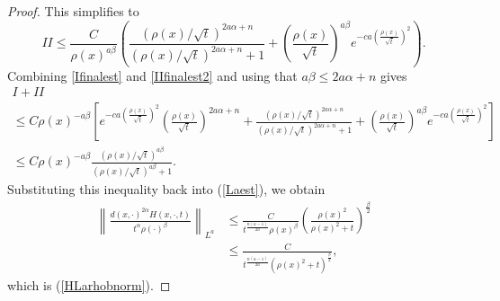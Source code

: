 \documentclass[10pt,a4paper]{amsart}
\begin{document}
\begin{proof}
    This simplifies to 
    \begin{equation} \label{IIfinalest2}
        II \le
        \frac C{\rho(x)^{a \beta} } \left( \frac{(\rho(x)/\sqrt t)^{2 a \alpha + n}}{(\rho(x)/\sqrt t)^{2 a \alpha+n} + 1}
        +  \left( \frac {\rho(x)} {\sqrt t}\right)^{a \beta}  e^{- c a \left(\frac{\rho(x)}{\sqrt t} \right)^2} \right) .
    \end{equation}
    Combining \eqref{Ifinalest} and \eqref{IIfinalest2} and using that $a \beta \le 2 a \alpha + n$ gives
    \begin{multline}
        I + II \\
        \le C \rho(x)^{- a\beta} \left[  e^{-c a \left( \frac {\rho(x)}{\sqrt t} \right)^2 } \left( \frac{\rho(x)}{\sqrt t} \right)^{2 a \alpha + n} +\frac{(\rho(x)/\sqrt t)^{2 a \alpha + n}}{(\rho(x)/\sqrt t)^{2 a \alpha+n} + 1}
        +  \left( \frac {\rho(x)} {\sqrt t}\right)^{a \beta}  e^{- c a \left(\frac{\rho(x)}{\sqrt t} \right)^2}  \right] \\
        \le C \rho(x)^{- a\beta} \frac{ ( \rho(x)/ \sqrt t )^{a \beta} }{(\rho(x)/\sqrt t)^{a \beta} +1}.
    \end{multline}
    Substituting this inequality back into (\ref{Laest}), we obtain
    \begin{equation*}
    \begin{split}
        \left\|  \frac{d(x,\cdot)^{2\alpha} H(x,\cdot, t) }{t^\alpha \rho(\cdot)^\beta} \right\|_{L^{a}} & \leq \frac{C}{t^{\frac{n(a - 1)}{2a}} \rho(x)^\beta} \left( \frac{ \rho(x)^{2} }{ \rho(x)^{2} + t} \right)^{\frac{\beta}{2}} \\
        & \leq \frac{C}{t^{\frac{n(a - 1)}{2a}} \left( \rho(x)^{2} + t \right)^{\frac{\beta}{2}} },
        \end{split}
    \end{equation*}
    which is (\ref{HLarhobnorm}).
\end{proof}
\end{document}
